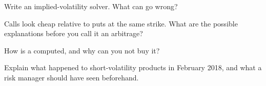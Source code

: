 \begin{interviewq}\label{iq:m1:volatility-first-contact:3}
Write an implied-volatility solver. What can go wrong?
\end{interviewq}

\begin{interviewq}\label{iq:m1:volatility-first-contact:4}
Calls look cheap relative to puts at the same strike. What are the possible
explanations before you call it an arbitrage?
\end{interviewq}

\begin{interviewq}\label{iq:m1:volatility-first-contact:5}
How is a  computed, and why can you not buy it?
\end{interviewq}

\begin{interviewq}\label{iq:m1:volatility-first-contact:6}
Explain what happened to short-volatility products in February 2018, and
what a risk manager should have seen beforehand.
\end{interviewq}
